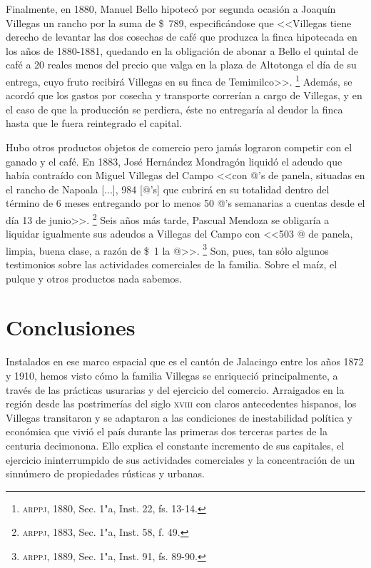 \documentclass[14pt,twoside,final]{extbook} %
\let\oldfootnote\footnote
\renewcommand\footnote[1]{%
\oldfootnote{\hspace{1mm}#1}}
\begin{document}
Finalmente, en 1880, Manuel Bello hipotecó por segunda ocasión a Joaquín Villegas un rancho por la suma de \$~789, especificándose que <<Villegas tiene derecho de levantar las dos cosechas de café que produzca la finca hipotecada en los años de 1880-1881, quedando en la obligación de abonar a Bello el quintal de café a 20 reales menos del precio que valga en la plaza de Altotonga el día de su entrega, cuyo fruto recibirá Villegas en su finca de Temimilco>>.\footnote{\textsc{arppj}, 1880, Sec. 1"a, Inst. 22, fs. 13-14.} Además, se acordó que los gastos por cosecha y transporte correrían a cargo de Villegas, y en el caso de que la producción se perdiera, éste no entregaría al deudor la finca hasta que le fuera reintegrado el capital.

Hubo otros productos objetos de comercio pero jamás lograron competir con el ganado y el café. En 1883, José Hernández Mondragón liquidó el adeudo que había contraído con Miguel Villegas del Campo <<con @'s de panela, situadas en el rancho de Napoala [...], 984 [@'s] que cubrirá en su totalidad dentro del término de 6 meses entregando por lo menos 50 @'s semanarias a cuentas desde el día 13 de junio>>.\footnote{\textsc{arppj}, 1883, Sec. 1"a, Inst. 58, f. 49.} Seis años más tarde, Pascual Mendoza se obligaría a liquidar igualmente sus adeudos a Villegas del Campo con <<503 @ de panela, limpia, buena clase, a razón de \$~1 la @>>.\footnote{\textsc{arppj}, 1889, Sec. 1"a, Inst. 91, fs. 89-90.} Son, pues, tan sólo algunos testimonios sobre las actividades comerciales de la familia. Sobre el maíz, el pulque y otros productos nada sabemos.
\chapter*{Conclusiones}\label{ch:conclusiones}
\thispagestyle{empty}
\pagestyle{fancy}
\fancyhf{} %
\fancyhead[RO,LE]{\iffloatpage{}{\thepage}}
\renewcommand\headrulewidth{\iffloatpage{0pt}{0pt}}
\setcounter{page}{127}
Instalados en ese marco espacial que es el cantón de Jalacingo entre los años 1872 y 1910, hemos visto cómo la familia Villegas se enriqueció principalmente, a través de las prácticas usurarias y del ejercicio del comercio. Arraigados en la región desde las postrimerías del siglo \textsc{xviii} con claros antecedentes hispanos, los Villegas transitaron y se adaptaron a las condiciones de inestabilidad política y económica que vivió el país durante las primeras dos terceras partes de la
centuria decimonona. Ello explica el constante incremento de sus capitales, el ejercicio ininterrumpido de sus actividades comerciales y la concentración de un sinnúmero de propiedades rústicas y urbanas.
\end{document}
